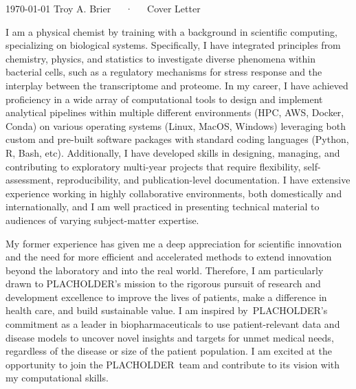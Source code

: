 \documentclass[11pt, a4paper]{awesome-cv}
\newcommand{\companyname}{PLACHOLDER}
\begin{document}
	
	\makecvheader[R]
	
	
	\makecvfooter
	{\today}
	{Troy A. Brier~~~·~~~Cover Letter}
	{}
	
	\makelettertitle
	\begin{cvletter}
		I am a physical chemist by training with a background in scientific computing, specializing on biological systems.
		Specifically, I have integrated principles from chemistry, physics, and statistics to investigate diverse phenomena within bacterial cells, such as a regulatory mechanisms for stress response and the interplay between the transcriptome and proteome.	
		In my career, I have achieved proficiency in a wide array of computational tools to design and implement analytical pipelines within multiple different environments (HPC, AWS, Docker, Conda) on various operating systems (Linux, MacOS, Windows) leveraging both custom and pre-built software packages with standard coding languages (Python, R, Bash, etc).
		Additionally, I have developed skills in designing, managing, and contributing to exploratory multi-year projects that require flexibility, self-assessment, reproducibility, and publication-level documentation.
		I have extensive experience working in highly collaborative environments, both domestically and internationally, and I am well practiced in presenting technical material to audiences of varying subject-matter expertise.
		
				
		\lettersection{Why \companyname?}
		My former experience has given me a deep appreciation for scientific innovation and the need for more efficient and accelerated methods to extend innovation beyond the laboratory and into the real world. 	
		Therefore, I am particularly drawn to \companyname's mission to the rigorous pursuit of research and development excellence to improve the lives of patients, make a difference in health care, and build sustainable value.
		I am inspired by~\companyname's commitment as a leader in biopharmaceuticals to use patient-relevant data and disease models to uncover novel insights and targets for unmet medical needs, regardless of the disease or size of the patient population.
		I am excited at the opportunity to join the \companyname~team and contribute to its vision with my computational skills.
				

\end{cvletter}
\end{document}
